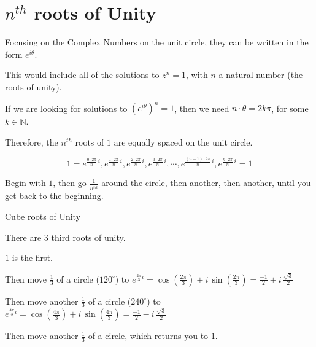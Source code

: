 \documentclass{ximera}
\begin{document}
\section{$n^{th}$ roots of Unity}


Focusing on the Complex Numbers on the unit circle, they can be written in the form $e^{i \theta}$.


This would include all of the solutions to $z^n = 1$, with $n$ a natural number (the roots of unity).




If we are looking for solutions to $(e^{i \theta})^n = 1$, then we need $n \cdot \theta = 2k\pi$, for some $k \in \mathbb{N}$.


Therefore, the $n^{th}$ roots of $1$ are equally spaced on the unit circle.  



\[
1=e^{\tfrac{0\cdot2\pi}{n}\,i}, e^{\tfrac{1\cdot2\pi}{n}\,i}, e^{\tfrac{2\cdot2\pi}{n}\,i}, e^{\tfrac{3\cdot2\pi}{n}\,i}, \cdots, e^{\tfrac{(n-1)\cdot2\pi}{n}\,i}, e^{\tfrac{n\cdot2\pi}{n}\,i}=1
\]



Begin with $1$, then go $\frac{1}{n^{th}}$ around the circle, then another, then another, until you get back to the beginning.




\begin{example}  Cube roots of Unity

There are $3$ third roots of unity.

$1$ is the first.

Then move $\frac{1}{3}$ of a circle ($120^{\circ}$) to $e^{\tfrac{2 \pi}{3} i} = \cos\left(\frac{2 \pi}{3}\right) + i \, \sin\left(\frac{2 \pi}{3}\right) = \frac{-1}{2} + i \, \frac{\sqrt{3}}{2}$

Then move another $\frac{1}{3}$ of a circle ($240^{\circ}$) to $e^{\tfrac{4 \pi}{3} i} = \cos\left(\frac{4 \pi}{3}\right) + i \, \sin\left(\frac{4 \pi}{3}\right) = \frac{-1}{2} - i \, \frac{\sqrt{3}}{2}$



Then move another $\frac{1}{3}$ of a circle, which returns you to $1$.




\end{example}
\end{document}

